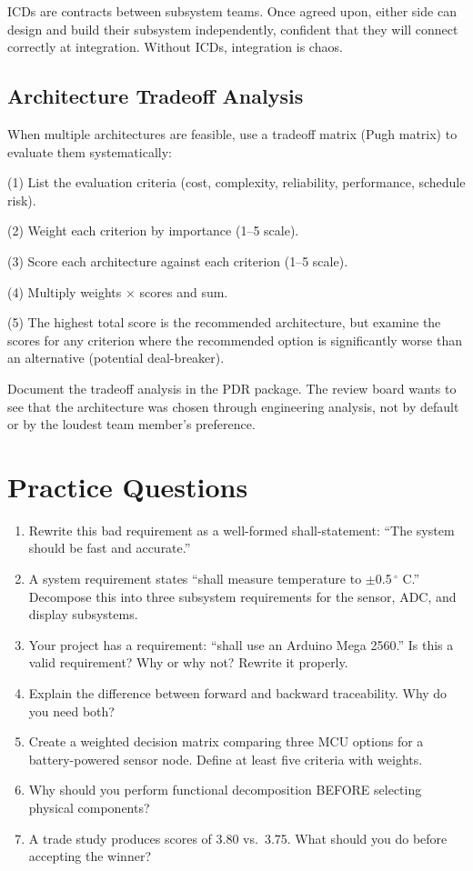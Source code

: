 \documentclass[11pt,letterpaper,twoside,openany]{book}
\begin{document}
ICDs are contracts between subsystem teams. Once agreed upon, either side can design and build their subsystem independently, confident that they will connect correctly at integration. Without ICDs, integration is chaos.

\subsection{Architecture Tradeoff Analysis}
When multiple architectures are feasible, use a tradeoff matrix (Pugh matrix) to evaluate them systematically:

(1) List the evaluation criteria (cost, complexity, reliability, performance, schedule risk).

(2) Weight each criterion by importance (1--5 scale).

(3) Score each architecture against each criterion (1--5 scale).

(4) Multiply weights $\times$ scores and sum.

(5) The highest total score is the recommended architecture, but examine the scores for any criterion where the recommended option is significantly worse than an alternative (potential deal-breaker).

Document the tradeoff analysis in the PDR package. The review board wants to see that the architecture was chosen through engineering analysis, not by default or by the loudest team member's preference.
\section{Practice Questions}
\begin{enumerate}[leftmargin=1.5em]
\item Rewrite this bad requirement as a well-formed shall-statement: ``The system should be fast and accurate.''
\item A system requirement states ``shall measure temperature to $\pm$0.5\,$^{\circ}$ C.'' Decompose this into three subsystem requirements for the sensor, ADC, and display subsystems.
\item Your project has a requirement: ``shall use an Arduino Mega 2560.'' Is this a valid requirement? Why or why not? Rewrite it properly.
\item Explain the difference between forward and backward traceability. Why do you need both?
\item Create a weighted decision matrix comparing three MCU options for a battery-powered sensor node. Define at least five criteria with weights.
\item Why should you perform functional decomposition BEFORE selecting physical components?
\item A trade study produces scores of 3.80 vs.\ 3.75. What should you do before accepting the winner?
\end{enumerate}
\end{document}

